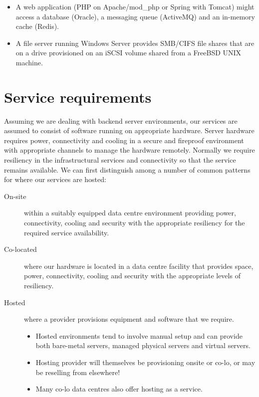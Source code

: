 \begin{itemize}
\item
  A web application (PHP on Apache/mod\_php or Spring with Tomcat) might
  access a database (Oracle), a messaging queue (ActiveMQ) and an
  in-memory cache (Redis).
\item
  A file server running Windows Server provides SMB/CIFS file shares
  that are on a drive provisioned on an iSCSI volume shared from a
  FreeBSD UNIX machine.
\end{itemize}

\section{Service requirements}
\label{sec:service-models}

Assuming we are dealing with backend server environments, our services
are assumed to consist of software running on appropriate hardware.
Server hardware requires power, connectivity and cooling in a secure and
fireproof environment with appropriate channels to manage the hardware
remotely. Normally we require resiliency in the infrastructural services
and connectivity so that the service remains available. We can first
distinguish among a number of common patterns for where our services are
hosted:

\begin{description}
\item[On-site]
  within a suitably equipped data centre environment providing power,
  connectivity, cooling and security with the appropriate resiliency for
  the required service availability.
\item[Co-located]
  where our hardware is located in a data centre facility that provides
  space, power, connectivity, cooling and security with the appropriate
  levels of resiliency.
\item[Hosted]
  where a provider provisions equipment and software that we require.
  
  \begin{itemize}
  \item
    Hosted environments tend to involve manual setup and can provide both
    bare-metal servers, managed physical servers and virtual servers.
  \item
    Hosting provider will themselves be provisioning onsite or co-lo, or
    may be reselling from elsewhere!
  \item
    Many co-lo data centres also offer hosting as a service.
  \end{itemize}
\end{description}

